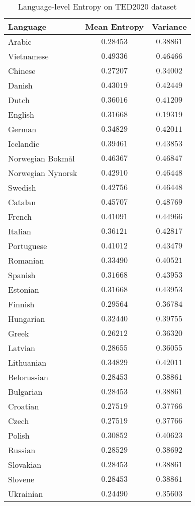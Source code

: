 \begin{table}[ht]
    \centering
    \caption{Language-level Entropy on TED2020 dataset}
    \begin{tabular}{lcc}
        \toprule
        \textbf{Language} & \textbf{Mean Entropy} & \textbf{Variance} \\
        \midrule
        Arabic & $0.28453$ & $0.38861$ \\ \hline
        Vietnamese & $0.49336$ & $0.46466$ \\ \hline
        Chinese & $0.27207$ & $0.34002$ \\ \hline
        Danish & $0.43019$ & $0.42449$ \\
        Dutch & $0.36016$ & $0.41209$ \\
        English & $0.31668$ & $0.19319$ \\
        German & $0.34829$ & $0.42011$ \\
        Icelandic & $0.39461$ & $0.43853$ \\
        Norwegian Bokmål & $0.46367$ & $0.46847$ \\
        Norwegian Nynorsk & $0.42910$ & $0.46448$ \\
        Swedish & $0.42756$ & $0.46448$ \\ \hline
        Catalan & $0.45707$ & $0.48769$ \\
        French & $0.41091$ & $0.44966$ \\
        Italian & $0.36121$ & $0.42817$ \\
        Portuguese & $0.41012$ & $0.43479$ \\
        Romanian & $0.33490$ & $0.40521$ \\
        Spanish & $0.31668$ & $0.43953$ \\ \hline
        Estonian & $0.31668$ & $0.43953$ \\
        Finnish & $0.29564$ & $0.36784$ \\
        Hungarian & $0.32440$ & $0.39755$ \\ \hline
        Greek & $0.26212$ & $0.36320$ \\ \hline
        Latvian & $0.28655$ & $0.36055$ \\
        Lithuanian & $0.34829$ & $0.42011$ \\ \hline
        Belorussian & $0.28453$ & $0.38861$ \\
        Bulgarian & $0.28453$ & $0.38861$ \\
        Croatian & $0.27519$ & $0.37766$ \\
        Czech & $0.27519$ & $0.37766$ \\
        Polish & $0.30852$ & $0.40623$ \\
        Russian & $0.28529$ & $0.38692$ \\
        Slovakian & $0.28453$ & $0.38861$ \\
        Slovene & $0.28453$ & $0.38861$ \\
        Ukrainian & $0.24490$ & $0.35603$ \\
        \bottomrule
    \end{tabular}
\end{table}